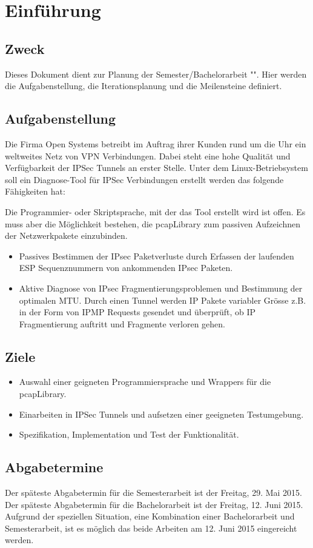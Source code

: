 \section{Einführung}
\label{sec:Einführung}

\subsection{Zweck}
Dieses Dokument dient zur Planung der Semester/Bachelorarbeit "\tool ". Hier werden die Aufgabenstellung, die Iterationsplanung und die Meilensteine definiert.

\subsection{Aufgabenstellung}
Die Firma Open Systems betreibt im Auftrag ihrer Kunden rund um die Uhr ein weltweites Netz von VPN Verbindungen. Dabei steht eine hohe Qualität und Verfügbarkeit der IPSec Tunnels an erster Stelle.
Unter dem Linux-Betriebsystem soll ein Diagnose-Tool für IPSec Verbindungen erstellt werden das folgende Fähigkeiten hat:

Die Programmier- oder Skriptsprache, mit der das Tool erstellt wird ist offen. Es muss aber die Möglichkeit bestehen, die pcapLibrary zum passiven Aufzeichnen der Netzwerkpakete einzubinden.

\begin{itemize}
	\item Passives Bestimmen der IPsec Paketverluste durch Erfassen der laufenden ESP Sequenznummern von ankommenden IPsec Paketen.
	\item Aktive Diagnose von IPsec Fragmentierungsproblemen und Bestimmung der optimalen MTU. Durch einen Tunnel werden IP Pakete variabler Grösse z.B. in der Form von IPMP Requests gesendet und überprüft, ob IP Fragmentierung auftritt und Fragmente verloren gehen.
\end{itemize}

\subsection{Ziele}

\begin{itemize}

  \item Auswahl einer geigneten Programmiersprache und Wrappers für die pcapLibrary.
  \item Einarbeiten in IPSec Tunnels und aufsetzen einer geeigneten Testumgebung.
  \item Spezifikation, Implementation und Test der \tool Funktionalität.

\end{itemize}

\subsection{Abgabetermine}
Der späteste Abgabetermin für die Semesterarbeit ist der Freitag, 29. Mai 2015.
Der späteste Abgabetermin für die Bachelorarbeit ist der Freitag, 12. Juni 2015.
Aufgrund der speziellen Situation, eine Kombination einer Bachelorarbeit und Semesterarbeit, ist es möglich das beide Arbeiten am 12. Juni 2015 eingereicht werden.